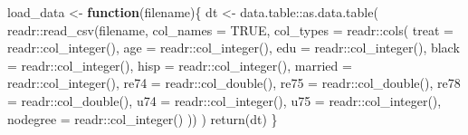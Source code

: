 \documentclass[
]{article}
\newenvironment{Shaded}{\begin{snugshade}}{\end{snugshade}}
\newcommand{\AttributeTok}[1]{\textcolor[rgb]{0.77,0.63,0.00}{#1}}
\newcommand{\ConstantTok}[1]{\textcolor[rgb]{0.00,0.00,0.00}{#1}}
\newcommand{\ControlFlowTok}[1]{\textcolor[rgb]{0.13,0.29,0.53}{\textbf{#1}}}
\newcommand{\DecValTok}[1]{\textcolor[rgb]{0.00,0.00,0.81}{#1}}
\newcommand{\FunctionTok}[1]{\textcolor[rgb]{0.00,0.00,0.00}{#1}}
\newcommand{\NormalTok}[1]{#1}
\newcommand{\OtherTok}[1]{\textcolor[rgb]{0.56,0.35,0.01}{#1}}
\newcommand{\SpecialCharTok}[1]{\textcolor[rgb]{0.00,0.00,0.00}{#1}}
\newcommand{\StringTok}[1]{\textcolor[rgb]{0.31,0.60,0.02}{#1}}
\begin{document}
\begin{Shaded}
\begin{Highlighting}[]
\NormalTok{load\_data }\OtherTok{\textless{}{-}} \ControlFlowTok{function}\NormalTok{(filename)\{}
\NormalTok{  dt }\OtherTok{\textless{}{-}}\NormalTok{ data.table}\SpecialCharTok{::}\FunctionTok{as.data.table}\NormalTok{(}
\NormalTok{    readr}\SpecialCharTok{::}\FunctionTok{read\_csv}\NormalTok{(filename,}
                     \AttributeTok{col\_names =} \ConstantTok{TRUE}\NormalTok{,}
                     \AttributeTok{col\_types =}\NormalTok{ readr}\SpecialCharTok{::}\FunctionTok{cols}\NormalTok{(}
                       \AttributeTok{treat =}\NormalTok{ readr}\SpecialCharTok{::}\FunctionTok{col\_integer}\NormalTok{(),}
                       \AttributeTok{age =}\NormalTok{ readr}\SpecialCharTok{::}\FunctionTok{col\_integer}\NormalTok{(),}
                       \AttributeTok{edu =}\NormalTok{ readr}\SpecialCharTok{::}\FunctionTok{col\_integer}\NormalTok{(),}
                       \AttributeTok{black =}\NormalTok{ readr}\SpecialCharTok{::}\FunctionTok{col\_integer}\NormalTok{(),}
                       \AttributeTok{hisp =}\NormalTok{ readr}\SpecialCharTok{::}\FunctionTok{col\_integer}\NormalTok{(),}
                       \AttributeTok{married =}\NormalTok{ readr}\SpecialCharTok{::}\FunctionTok{col\_integer}\NormalTok{(),}
                       \AttributeTok{re74 =}\NormalTok{ readr}\SpecialCharTok{::}\FunctionTok{col\_double}\NormalTok{(),}
                       \AttributeTok{re75 =}\NormalTok{ readr}\SpecialCharTok{::}\FunctionTok{col\_double}\NormalTok{(),}
                       \AttributeTok{re78 =}\NormalTok{ readr}\SpecialCharTok{::}\FunctionTok{col\_double}\NormalTok{(),}
                       \AttributeTok{u74 =}\NormalTok{ readr}\SpecialCharTok{::}\FunctionTok{col\_integer}\NormalTok{(),}
                       \AttributeTok{u75 =}\NormalTok{ readr}\SpecialCharTok{::}\FunctionTok{col\_integer}\NormalTok{(),}
                       \AttributeTok{nodegree =}\NormalTok{ readr}\SpecialCharTok{::}\FunctionTok{col\_integer}\NormalTok{()}
\NormalTok{                     ))}
\NormalTok{  )}
  \FunctionTok{return}\NormalTok{(dt)}
\NormalTok{\}}
\end{Highlighting}
\end{Shaded}

\begin{Shaded}
\end{Shaded}
\end{document}
